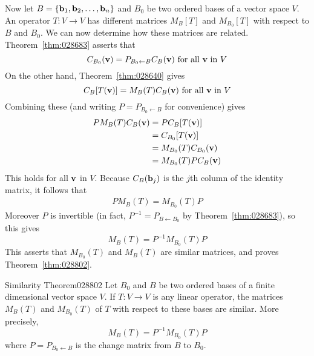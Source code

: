 Now let $B = \{\textbf{b}_{1}, \textbf{b}_{2}, \dots, \textbf{b}_{n}\}$ and $B_{0}$ be two ordered bases of a vector space $V$. An operator $T : V \to V$ has different matrices $M_{B}[T]$ and $M_{B_0}[T]$ with respect to $B$ and $B_{0}$. We can now determine how these matrices are related. Theorem~\ref{thm:028683} asserts that
\begin{equation*}
C_{B_0}(\textbf{v}) = P_{B_0 \gets B}C_B(\textbf{v}) \mbox{ for all } \textbf{v} \mbox{ in } V
\end{equation*}
On the other hand, Theorem~\ref{thm:028640} gives
\begin{equation*}
C_B[T(\textbf{v})] = M_B(T)C_B(\textbf{v}) \mbox{ for all } \textbf{v} \mbox{ in } V
\end{equation*}
Combining these (and writing $P = P_{B_{0} \gets B}$ for convenience) gives
\begin{align*}
PM_B(T)C_B(\textbf{v}) & = PC_B[T(\textbf{v})] \\
& = C_{B_0}[T(\textbf{v})] \\
& = M_{B_0}(T)C_{B_0}(\textbf{v}) \\
& = M_{B_0}(T)PC_B(\textbf{v})
\end{align*}
This holds for all $\textbf{v}$ in $V$. Because $C_{B}(\textbf{b}_{j})$ is the $j$th column of the identity matrix, it follows that
\begin{align*}
PM_B(T) = M_{B_0}(T)P
\end{align*}
Moreover $P$ is invertible (in fact, $P^{-1} = P_{B \gets B_0}$ by Theorem~\ref{thm:028683}), so this gives
\begin{equation*}
M_B(T) = P^{-1}M_{B_0}(T)P
\end{equation*}
This asserts that $M_{B_0}(T)$ and $M_{B}(T)$ are similar matrices, and proves Theorem~\ref{thm:028802}.


\begin{theorem}{Similarity Theorem}{028802}
Let $B_{0}$ and $B$ be two ordered bases of a finite dimensional vector space $V$. If $T : V \to V$ is any linear operator, the matrices $M_{B}(T)$ and $M_{B_0}(T)$ of $T$ with respect to these bases are similar. More precisely,
\begin{equation*}
M_B(T) = P^{-1}M_{B_0}(T)P
\end{equation*}
where $P = P_{B_0 \gets B}$ is the change matrix from $B$ to $B_{0}$.
\end{theorem}

